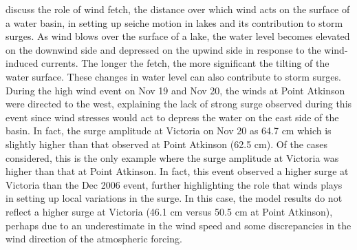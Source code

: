 \documentclass[pdftex,10pt]{article}
\begin{document}
\citet{danard2003storm} discuss the role of wind fetch, the distance over which wind acts on the surface of a water basin, in setting up seiche motion in lakes and its contribution to storm surges. As wind blows over the surface of a lake, the water level becomes elevated on the downwind side and depressed on the upwind side in response to the wind-induced currents. The longer the fetch, the more significant the tilting of the water surface. These changes in water level can also contribute to storm surges.  During the high wind event on Nov 19 and Nov 20, the winds at Point Atkinson were directed to the west, explaining the lack of strong surge observed during this event since wind stresses would act to depress the water on the east side of the basin. In fact, the surge amplitude at Victoria on Nov 20 as 64.7 cm which is slightly higher than that observed at Point Atkinson (62.5 cm). Of the cases considered, this is the only example where the surge amplitude at Victoria was higher than that at Point Atkinson. In fact, this event observed a higher surge at Victoria than the Dec 2006 event, further highlighting the role that winds plays in setting up local variations in the surge. In this case, the model results do not reflect a higher surge at Victoria (46.1 cm versus 50.5 cm at Point Atkinson), perhaps due to an underestimate in the wind speed and some discrepancies in the wind direction of the atmospheric forcing.  
\end{document}
